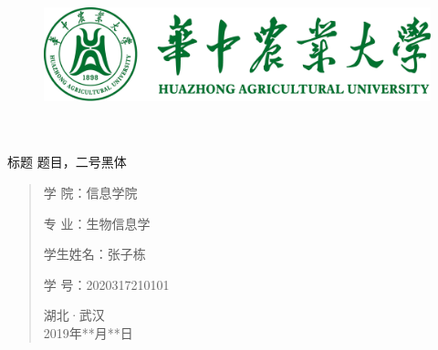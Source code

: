 \documentclass[UTF8]{ctexart}
\date{}
\begin{document}
	\begin{figure}[t]
		\centering
        \includegraphics[scale=0.7]{img/HZAU.png}
	\end{figure}

	\begin{center}
		\quad \\
		\quad \\
		\heiti \fontsize{45}{17} 标题
		\vskip 3.5cm
		\heiti {} 题目，二号黑体	
	\end{center}
	\vskip 3.5cm

	\begin{quotation}
		\heiti \fontsize{15}{15}
		\doublespacing
		\par\setlength\parindent{12em}
		\quad

		学\hspace{0.61cm} 院：信息学院

		专\hspace{0.61cm} 业：生物信息学

		学生姓名：张子栋

		学\hspace{0.61cm} 号：2020317210101

		\vskip 2cm
		\centering
        湖北·武汉\\
		2019年**月**日
	\end{quotation}
\end{document}
